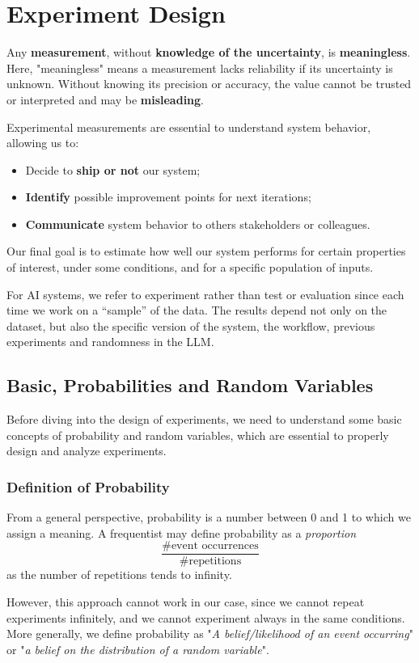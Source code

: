 \section{Experiment Design}
Any \textbf{measurement}, without \textbf{knowledge of the uncertainty}, is \textbf{meaningless}.
Here, "meaningless" means a measurement lacks reliability if its uncertainty is unknown.
Without knowing its precision or accuracy, the value cannot be trusted or interpreted and may be \textbf{misleading}.

Experimental measurements are essential to understand system behavior, allowing us to:
\begin{itemize}
    \item Decide to \textbf{ship or not} our system;
    \item \textbf{Identify} possible improvement points for next iterations;
    \item \textbf{Communicate} system behavior to others stakeholders or colleagues.
\end{itemize}
Our final goal is to estimate how well our system performs for certain properties of interest, 
under some conditions, and for a specific population of inputs.

For AI systems, we refer to experiment rather than test or evaluation since each time we work on a “sample” of the data.
The results depend not only on the dataset, but also the specific version of the system, 
the workflow, previous experiments and randomness in the LLM.

\subsection{Basic, Probabilities and Random Variables}
Before diving into the design of experiments, we need to understand some basic concepts of probability and random variables, 
which are essential to properly design and analyze experiments.

\subsubsection{Definition of Probability}
From a general perspective, probability is a number between 0 and 1 to which we assign a meaning.
A frequentist may define probability as a \textit{proportion} 
\[\frac{\text{\#event occurrences}}{\text{\#repetitions}}\]
as the number of repetitions tends to infinity.

However, this approach cannot work in our case, since we cannot repeat experiments infinitely, and we cannot experiment always in the same conditions.
More generally, we define probability as "\textit{A belief/likelihood of an event occurring}" or  "\textit{a belief on the distribution of a random variable}".

